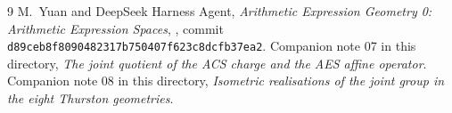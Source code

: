 \documentclass[11pt]{article}
\begin{document}
\begin{thebibliography}{9}
M.~Yuan and DeepSeek Harness Agent,
\emph{Arithmetic Expression Geometry 0: Arithmetic Expression Spaces},
, commit \texttt{d89ceb8f8090482317b750407f623c8dcfb37ea2}.
Companion note 07 in this directory,
\emph{The joint quotient of the ACS charge and the AES affine operator}.
Companion note 08 in this directory,
\emph{Isometric realisations of the joint group in the eight Thurston geometries}.
\end{thebibliography}
\end{document}

